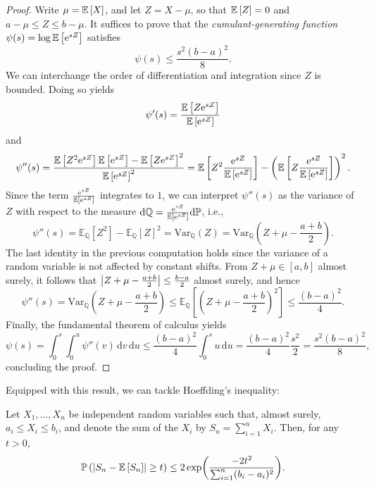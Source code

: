 \begin{proof}
Write $\mu = \mathbb{E}\left[X\right]$, and let $Z = X - \mu$, so that $\mathbb{E}\left[Z\right] = 0$ and $a - \mu \leq Z \leq b - \mu$. It suffices to prove that the \emph{cumulant-generating function} $\psi(s) = \log\mathbb{E}\left[\mathrm{e}^{sZ}\right]$ satisfies
\[
    \psi(s) \leq \frac{s^2(b-a)^2}{8}.
\]
We can interchange the order of differentiation and integration since $Z$ is bounded. Doing so yields
\[
    \psi'(s) = \frac{\mathbb{E}\left[Z\mathrm{e}^{sZ}\right]}{\mathbb{E}\left[\mathrm{e}^{sZ}\right]}
\]
and
\[
    \psi''(s) = \frac{\mathbb{E}\left[Z^2\mathrm{e}^{sZ}\right] \mathbb{E}\left[\mathrm{e}^{sZ}\right] - \mathbb{E}\left[Z\mathrm{e}^{sZ}\right]^2}{\mathbb{E}\left[\mathrm{e}^{sZ}\right]^2} = \mathbb{E}\left[Z^2 \frac{\mathrm{e}^{sZ}}{\mathbb{E}\left[\mathrm{e}^{sZ}\right]}\right] - \left(\mathbb{E}\left[Z \frac{\mathrm{e}^{sZ}}{\mathbb{E}\left[\mathrm{e}^{sZ}\right]}\right]\right)^2.
\]
Since the term $\frac{\mathrm{e}^{sZ}}{\mathbb{E}\left[\mathrm{e}^{sZ}\right]}$ integrates to $1$, we can interpret $\psi''(s)$ as the variance of $Z$ with respect to the measure $\mathrm{d}\mathbb{Q} = \frac{\mathrm{e}^{sZ}}{\mathbb{E}\left[\mathrm{e}^{sZ}\right]} \mathrm{d}\mathbb{P}$, i.e.,
\[
    \psi''(s) = \mathbb{E}_{\mathbb{Q}}[Z^2] - \mathbb{E}_{\mathbb{Q}}[Z]^2 = \mathrm{Var}_{\mathbb{Q}}(Z) = \mathrm{Var}_{\mathbb{Q}}\left(Z + \mu - \frac{a+b}{2}\right).
\]
The last identity in the previous computation holds since the variance of a random variable is not affected by constant shifts. From $Z + \mu \in [a,b]$ almost surely, it follows that $\abs{Z + \mu - \frac{a+b}{2}} \leq \frac{b-a}{2}$ almost surely, and hence
\[
    \psi''(s) = \mathrm{Var}_{\mathbb{Q}}\left(Z + \mu - \frac{a+b}{2}\right) \leq \mathbb{E}_{\mathbb{Q}}\left[\left(Z + \mu - \frac{a+b}{2}\right)^2\right] \leq \frac{(b-a)^2}{4}.
\]
Finally, the fundamental theorem of calculus yields
\[
    \psi(s) = \int_0^s\int_0^u \psi''(v) \, \mathrm{d}v \, \mathrm{d}u \leq \frac{(b-a)^2}{4} \int_0^s u \, \mathrm{d}u = \frac{(b-a)^2}{4} \frac{s^2}{2} = \frac{s^2(b-a)^2}{8},
\]
concluding the proof.
\end{proof}

Equipped with this result, we can tackle Hoeffding's inequality:

\begin{theorem}[Hoeffding, 1963]
\label{thm: hoeffding}
Let $X_1, \dots, X_n$ be independent random variables such that, almost surely, $a_i \leq X_i \leq b_i$, and denote the sum of the $X_i$ by $S_n = \sum_{i=1}^n X_i$. Then, for any $t>0$,
\[
    \mathbb{P}\left(\abs{S_n - \mathbb{E}\left[S_n\right]} \geq t\right) \leq 2 \exp(\frac{-2t^2}{\sum_{i=1}^n (b_i - a_i)^2}).
\]
\end{theorem}

